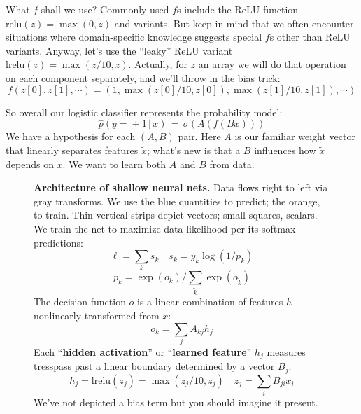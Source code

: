 What $f$ shall we use?
Commonly used $f$s include the ReLU function $\text{relu}(z)=\max(0,z)$ and
variants.
But keep in mind that we often encounter situations where domain-specific
knowledge suggests special $f$s other than ReLU variants.  Anyway, let's use
the ``leaky'' ReLU variant $\text{lrelu}(z)=\max(z/10,z)$.  Actually, for $z$ an array
we will do that operation on each component separately, and we'll throw in
the bias trick:
$$
  f(z[0], z[1], \cdots) = (1, \max(z[0]/10,z[0]), \max(z[1]/10,z[1]), \cdots)
$$

So overall our logistic classifier represents the probability model:
$$
  \hat p(y\!=\!+1\,|\,x) \,=\, \sigma(A(f(Bx)))
$$
We have a hypothesis for each $(A,B)$ pair.  Here $A$ is our familiar weight
vector that linearly separates features $\tilde x$; what's new is that a $B$
influences how $\tilde x$ depends on $x$.  We want to learn both $A$ and $B$
from data.
        \begin{figure}[h]
          \centering
          \caption{%
            \textbf{Architecture of shallow neural nets.} Data flows right to left via {\gre
            gray} transforms.  We use the {\blu blue} quantities to predict;
            the {\color{orange} orange}, to train.  Thin vertical
            strips depict vectors; small squares, scalars.  
            We train the net to maximize data likelihood per its softmax
            predictions:\vspace{-0.1cm}
            $$
                \ell = \textstyle\sum_k s_k 
                \quad
                s_k = y_k \log(1/p_k)
            $$
            \vspace{-0.4cm}
            $$
                p_k = \exp(o_k) /\!\textstyle\sum_{\tilde k} \exp(o_{\tilde k})
            $$
            The decision function $o$ is a linear combination of features $h$
            nonlinearly transformed from $x$:\vspace{-0.1cm}
            $$
                o_k = \textstyle\sum_{j} A_{kj} h_j 
            $$
            Each ``\textbf{hidden activation}'' or ``\textbf{learned feature}''
            $h_j$ measures tresspass past a linear boundary determined by a
            vector $B_j$:\vspace{-0.1cm}
            $$
                h_j = \text{lrelu}(z_j) = \max(z_j/10,z_j)
                \quad
                z_j = \textstyle\sum_{i} B_{ji} x_i 
            $$
            We've not depicted a bias term but you should imagine it present.
          }
        \end{figure}%


